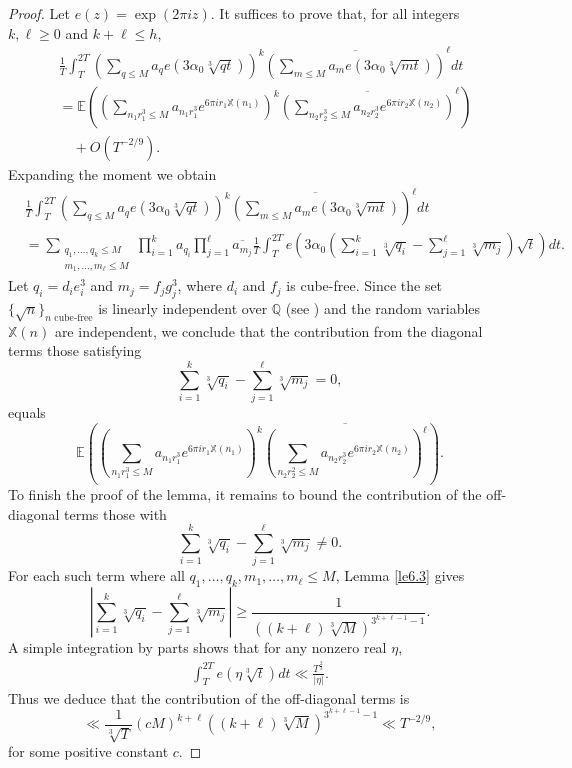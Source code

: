 \documentclass[10pt,leqno]{amsart}
\numberwithin{equation}{section}
\begin{document}
\begin{proof}
Let $e(z)=\exp(2\pi iz)$. It suffices to prove that, for all integers $k, \ell \geqslant 0$ and $k+\ell \leqslant h$,
\[
\begin{aligned}
& \frac{1}{T} \int_T^{2 T}\left(\sum_{q \leqslant M} a_q e\left(3\alpha_0 \sqrt[3]{q t}\right)\right)^k{\overline{\left(\sum_{m \leqslant M} a_m e\left(3\alpha_0 \sqrt[3]{m t}\right)\right)}}^{\ell} d t \\
& =\mathbb{E}\left(\left(\sum_{n_1 r_1^3 \leqslant M} a_{n_1 r_1^3} e^{6 \pi i r_1 \mathbb{X}\left(n_1\right)}\right)^k \overline{\left(\sum_{n_2 r_2^3 \leqslant M} a_{n_2 r_2^3} e^{6 \pi i r_2 \mathbb{X}\left(n_2\right)}\right)}^{\ell}\right)\\
&\quad +O\left(T^{-2 / 9}\right).
\end{aligned}
\]
 Expanding the moment we obtain
\[
\begin{aligned}
& \left.\frac{1}{T} \int_T^{2 T}\left(\sum_{q \leqslant M} a_q e\left(3\alpha_0 \sqrt[3]{q t}\right)\right)^k \overline{\left(\sum_{m \leqslant M} a_m e\left(3\alpha_0 \sqrt[3]{m t}\right)\right.}\right)^{\ell} d t \\
& =\sum_{\substack{q_1, \ldots, q_k \leqslant M \\
m_1, \ldots, m_{\ell} \leqslant M}} \prod_{i=1}^k a_{q_i} \prod_{j=1}^{\ell} \overline{a_{m_j}} \frac{1}{T} \int_T^{2 T} e\left(3\alpha_0\left(\sum_{i=1}^k \sqrt[3]{q_i}-\sum_{j=1}^{\ell} \sqrt[3]{m_j}\right) \sqrt{t}\right) d t.
\end{aligned}
\]
Let $q_i = d_i e_i^3$ and $m_j = f_j g_j^3$, where $d_i$ and $f_j$ is cube-free. Since the set $\{\sqrt{n}\}_{n\text{ cube-free}}$ is linearly independent over $\mathbb{Q}$ (see \cite[Theorem 2]{MR2327}) and the random variables $\mathbb{X}(n)$ are independent, we conclude that the contribution from the diagonal terms those satisfying
\[
\sum_{i=1}^k \sqrt[3]{q_i} - \sum_{j=1}^{\ell} \sqrt[3]{m_j} = 0,
\]
equals
\[
\mathbb{E}\left(\left(\sum_{n_1 r_1^3 \leqslant M} a_{n_1 r_1^3} e^{6 \pi i r_1 \mathbb{X}\left(n_1\right)}\right)^k \overline{\left(\sum_{n_2 r_2^2 \leqslant M} a_{n_2 r_2^3} e^{6 \pi i r_2 \mathbb{X}\left(n_2\right)}\right)^{\ell}}\right) .
\]
To finish the proof of the lemma, it remains to bound the contribution of the off-diagonal terms those with
\[
\sum_{i=1}^k \sqrt[3]{q_i} - \sum_{j=1}^{\ell} \sqrt[3]{m_j} \neq 0.
\]
For each such term where all $q_1, \ldots, q_k, m_1, \ldots, m_{\ell} \leqslant M$, Lemma \ref{le6.3} gives
\[
\left|\sum_{i=1}^k \sqrt[3]{q_i}-\sum_{j=1}^{\ell} \sqrt[3]{m_j}\right| \geqslant \frac{1}{((k+\ell) \sqrt[3]{M})^{3^{k+\ell-1}-1}} .
\]
A simple integration by parts shows that for any nonzero real $\eta$,
\[
\begin{aligned}
\int_T^{2 T} e(\eta \sqrt[3]{t}) d t\ll \frac{T^\frac{2}{3}}{|\eta|}.
\end{aligned}
\]
Thus we deduce that the contribution of the off-diagonal terms  is
\[
\ll \frac{1}{\sqrt[3]{T}}\left(c M\right)^{k+\ell}((k+\ell) \sqrt[3]{M})^{3^{k+\ell-1}-1} \ll T^{-2 / 9},
\]
for some positive constant $c$.
\end{proof}
\end{document}
